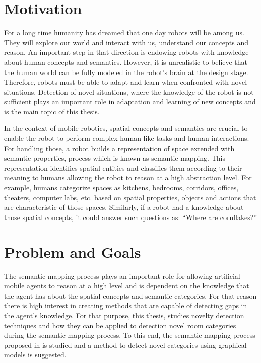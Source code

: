 \documentclass[9pt,a4paper]{extarticle}
\begin{document}
\begin{multicols}{2}

\section{Motivation}
For a long time humanity has dreamed that one day robots will be among us. They will explore our world
and interact with us, understand our concepts and reason. An important step in that direction is endowing 
robots with knowledge about human concepts and semantics. However, it is unrealistic to believe that the 
human world can be fully modeled in the robot's brain at the design stage. Therefore, robots must be able 
to adapt and learn when confronted with novel situations. Detection of novel situations, where the knowledge
of the robot is not sufficient plays an important role in adaptation and learning of new concepts and 
is the main topic of this thesis.

In the context of mobile robotics, spatial concepts and semantics are crucial to enable the robot to perform
complex human-like tasks and human interactions. For handling those, a robot builds a representation
of space extended with semantic properties, process which is known as semantic mapping.
This representation identifies spatial entities and classifies them according to their meaning to
humans allowing the robot to reason at a high abstraction level. For example, humans categorize spaces as 
kitchens, bedrooms, corridors, offices, theaters, computer labs, etc. based on spatial properties, 
objects and actions that are characteristic of those spaces. Similarly, if a robot had a knowledge about
those spatial concepts, it could answer such questions as: ``Where are cornflakes?''

\section{Problem and Goals}
The semantic mapping process plays an important role for allowing artificial mobile agents to reason at 
a high level and is dependent on the knowledge that the agent has about the spatial concepts and semantic 
categories. For that reason there is high interest in creating methods that are capable of detecting 
gaps in the agent's knowledge. For that purpose, this thesis, studies novelty detection techniques and 
how they can be applied to detection novel room categories during the semantic mapping process.
To this end, the semantic mapping process proposed in \cite{pronobis2011phd} is studied and a method
to detect novel categories using graphical models is suggested.


\end{multicols}
\end{document}
